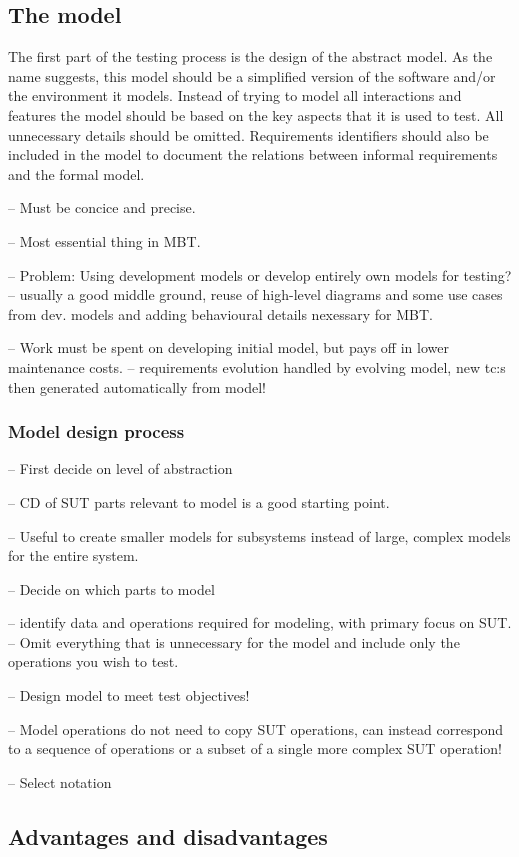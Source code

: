 \subsection{The model}
The first part of the testing process is the design of the abstract model. As the name suggests, this model should be a simplified version of the software and/or the environment it models. Instead of trying to model all interactions and features the model should be based on the key aspects that it is used to test. All unnecessary details should be omitted. Requirements identifiers should also be included in the model to document the relations between informal requirements and the formal model.

-- Must be concice and precise. 

-- Most essential thing in MBT.

-- Problem: Using development models or develop entirely own models for testing? 
	-- usually a good middle ground, reuse of high-level diagrams and some use cases from dev. models and adding behavioural details nexessary for MBT.

-- Work must be spent on developing initial model, but pays off in lower maintenance costs.
	-- requirements evolution handled by evolving model, new tc:s then generated automatically from model! 
	
\subsubsection{Model design process}
-- First decide on level of abstraction

-- CD of SUT parts relevant to model is a good starting point.

-- Useful to create smaller models for subsystems instead of large, complex models for the entire system. 

-- Decide on which parts to model

-- identify data and operations required for modeling, with primary focus on SUT.
	-- Omit everything that is unnecessary for the model and include only the operations you wish to test.
	
-- Design model to meet test objectives!

-- Model operations do not need to copy SUT operations, can instead correspond to a sequence of operations or a subset of a single more complex SUT operation!

-- Select notation

\subsection{Advantages and disadvantages}

